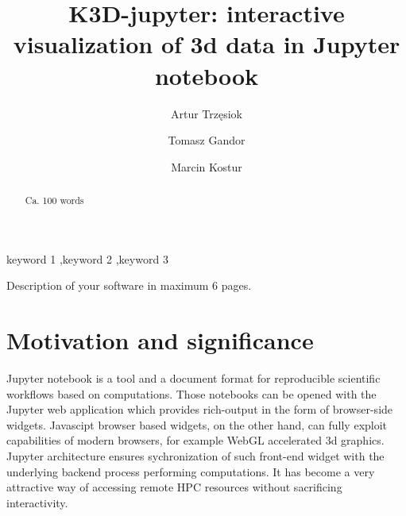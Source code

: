 \documentclass[preprint,12pt, a4paper]{elsarticle}
\begin{document}
\begin{frontmatter}

\title{K3D-jupyter: interactive visualization of 3d data in Jupyter notebook}


\author[cube]{Artur Trzęsiok}
\author[fp]{Tomasz Gandor}
\author[sil]{Marcin Kostur}

\address[cube]{Cubeproject}
\address[sil]{Institute of Physics, University of Silesia, 41-500 Chorzów, Poland}
\address[fp]{Future Processing, 44-100 Gliwice, Poland}
\begin{abstract}
Ca. 100 words

\end{abstract}

\begin{keyword}
keyword 1 \sep keyword 2 \sep keyword 3



\end{keyword}

\end{frontmatter}

\linenumbers


Description of your software in maximum 6 pages.

\section{Motivation and significance}
\label{}

Jupyter notebook is a tool and a document format for reproducible
scientific workflows based on computations. Those notebooks can be
opened with the Jupyter web application which provides rich-output in
the form of browser-side widgets. Javascipt browser based widgets, on
the other hand, can fully exploit capabilities of modern browsers, for
example WebGL accelerated 3d graphics. Jupyter architecture ensures
sychronization of such front-end widget with the underlying backend
process performing computations. It has become a very attractive way
of accessing remote HPC resources without sacrificing interactivity.
\end{document}
